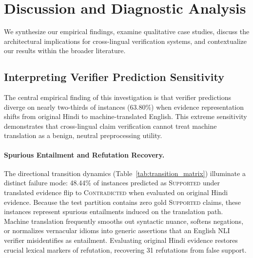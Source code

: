 \section{Discussion and Diagnostic Analysis}
\label{sec:discussion}

We synthesize our empirical findings, examine qualitative case studies, discuss the architectural implications for cross-lingual verification systems, and contextualize our results within the broader literature.

\subsection{Interpreting Verifier Prediction Sensitivity}
The central empirical finding of this investigation is that verifier predictions diverge on nearly two-thirds of instances (63.80\%) when evidence representation shifts from original Hindi to machine-translated English. This extreme sensitivity demonstrates that cross-lingual claim verification cannot treat machine translation as a benign, neutral preprocessing utility.

\paragraph{Spurious Entailment and Refutation Recovery.}
The directional transition dynamics (Table~\ref{tab:transition_matrix}) illuminate a distinct failure mode: 48.44\% of instances predicted as \textsc{Supported} under translated evidence flip to \textsc{Contradicted} when evaluated on original Hindi evidence. Because the test partition contains zero gold \textsc{Supported} claims, these instances represent spurious entailments induced on the translation path. Machine translation frequently smooths out syntactic nuance, softens negations, or normalizes vernacular idioms into generic assertions that an English NLI verifier misidentifies as entailment. Evaluating original Hindi evidence restores crucial lexical markers of refutation, recovering 31 refutations from false support.

